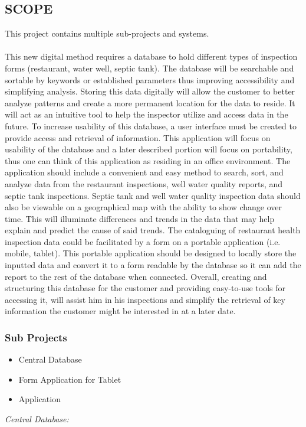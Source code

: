 \documentclass[twoside,letterpaper]{article}
\begin{document}
\subsection[PRODUCT SCOPE]{\rmfamily\bfseries\color{black}
SCOPE}
{\rmfamily\color{black}
This project contains multiple sub-projects and systems. 
\\     \\
This new digital method requires a database to hold different types of inspection forms (restaurant, water well, septic tank). The database will be searchable and sortable by keywords or established parameters thus improving accessibility and simplifying analysis. Storing this data digitally will allow the customer to better analyze patterns and create a more permanent location for the data to reside. It will act as an intuitive tool to help the inspector utilize and access data in the future. To increase usability of this database, a user interface must be created to provide access and retrieval of information. This application will focus on usability of the database and a later described portion will focus on portability, thus one can think of this application as residing in an office environment. The application should include a convenient and easy method to search, sort, and analyze data from the restaurant inspections, well water quality reports, and septic tank inspections. Septic tank and well water quality inspection data should also be viewable on a geographical map with the ability to show change over time. This will illuminate differences and trends in the data that may help explain and predict the cause of said trends. The cataloguing of restaurant health inspection data could be facilitated by a form on a portable application (i.e. mobile, tablet). This portable application should be designed to locally store the inputted data and convert it to a form readable by the database so it can add the report to the rest of the database when connected. Overall, creating and structuring this database for the customer and providing easy-to-use tools for accessing it, will assist him in his inspections and simplify the retrieval of key information the customer might be interested in at a later date.
\subsubsection{Sub Projects}
\begin{itemize}
\item{Central Database}
\item{Form Application for Tablet}
\item{Application}
\end{itemize}
\textit{Central Database:}
\newline 

}
\end{document}
